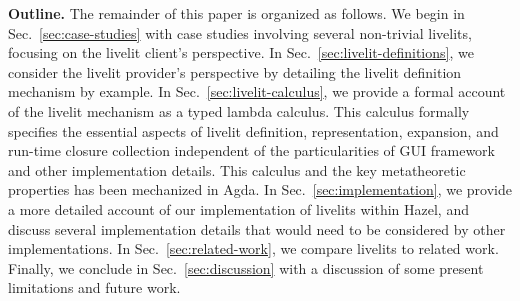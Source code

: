 \noindent
\textbf{Outline.} The remainder of this paper is organized as follows. We begin in Sec.~\ref{sec:case-studies} with case studies
involving several non-trivial livelits, focusing on the livelit client's perspective.
In Sec.~\ref{sec:livelit-definitions}, we consider the livelit provider's perspective by detailing the livelit
definition mechanism by example.
In Sec.~\ref{sec:livelit-calculus}, we provide a formal account of the livelit mechanism as a typed lambda calculus.
This calculus formally specifies the essential aspects of livelit definition, representation, expansion,
and run-time closure collection independent of the particularities of GUI framework and other implementation details.
This calculus and the key metatheoretic properties has been mechanized in Agda.
In Sec.~\ref{sec:implementation}, we provide a more detailed account of our implementation of livelits within Hazel,
and discuss several implementation details that would need to be considered by other implementations.
In Sec.~\ref{sec:related-work}, we compare livelits to related work.
Finally, we conclude in Sec.~\ref{sec:discussion} with a discussion of some present limitations and future work.